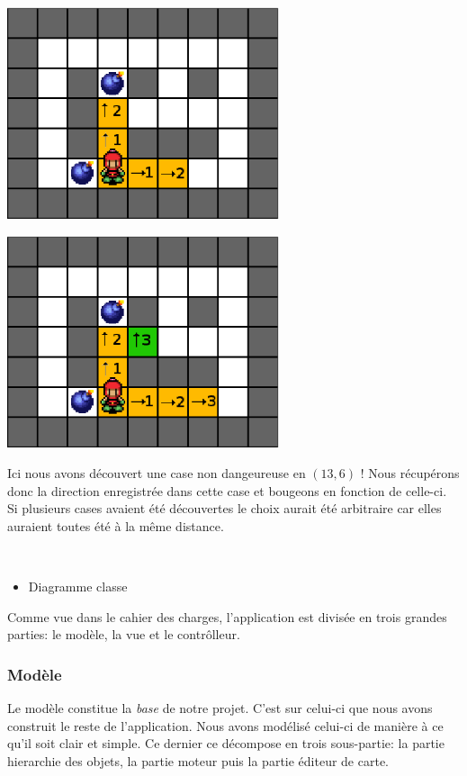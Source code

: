 			\begin{center}
				\includegraphics[width=8cm]{./Analyse/Img/largeur_3.eps}
				
				\includegraphics[width=8cm]{./Analyse/Img/largeur_4.eps}
			\end{center}
			
			Ici nous avons découvert une case non dangeureuse en $(13,6)$ !
			Nous récupérons donc la direction enregistrée dans cette case et bougeons en fonction de celle-ci.
			Si plusieurs cases avaient été découvertes le choix aurait été arbitraire car elles auraient toutes été à la même distance.
			
			$\,$
			
	\begin{itemize}
		\item{Diagramme classe}
	\end{itemize}
	
	Comme vue dans le cahier des charges, l'application est divisée en trois grandes parties: le modèle, la vue et le contrôlleur.
	
	\subsubsection{Modèle}
	
	Le modèle constitue la \textit{base} de notre projet. C'est sur celui-ci que nous avons construit le reste de l'application. Nous avons modélisé celui-ci de manière à ce qu'il soit clair et simple. Ce dernier ce décompose en trois sous-partie: la partie hierarchie des objets, la partie moteur puis la partie éditeur de carte.\\
	
